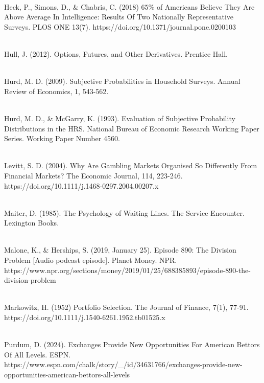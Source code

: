 \documentclass[sn-mathphys-num]{sn-jnl}
\theoremstyle{thmstyleone}%
\theoremstyle{thmstyletwo}%
\theoremstyle{thmstylethree}%
\begin{document}
\begin{thebibliography}{9}
\\Heck, P., Simons, D., \& Chabris, C. (2018) $65\%$ of Americans Believe They Are Above Average In Intelligence: Results Of Two Nationally Representative Surveys. PLOS ONE 13(7). https://doi.org/10.1371/journal.pone.0200103 \vspace{5pt}

\\Hull, J. (2012). Options, Futures, and Other Derivatives. Prentice Hall.  \vspace{5pt}

\\Hurd, M. D. (2009). Subjective Probabilities in Household Surveys. Annual Review of Economics, 1, 543-562. \vspace{5pt}

\\Hurd, M. D., \& McGarry, K. (1993). Evaluation of Subjective Probability Distributions in the HRS. National Bureau of Economic Research Working Paper Series. Working Paper Number 4560. \vspace{5pt}

\\Levitt, S. D. (2004). Why Are Gambling Markets Organised So Differently From Financial Markets? The Economic Journal, 114, 223-246. https://doi.org/10.1111/j.1468-0297.2004.00207.x \vspace{5pt}

\\Maiter, D. (1985). The Psychology of Waiting Lines. The Service Encounter. Lexington Books. \vspace{5pt}

\\Malone, K., \& Herships, S. (2019, January 25). Episode 890: The Division Problem [Audio podcast episode]. Planet Money. NPR.  https://www.npr.org/sections/money/2019/01/25/688385893/episode-890-the-division-problem \vspace{5pt}

\\Markowitz, H. (1952) Portfolio Selection. The Journal of Finance, 7(1), 77-91. https://doi.org/10.1111/j.1540-6261.1952.tb01525.x \vspace{5pt}

\\Purdum, D. (2024). Exchanges Provide New Opportunities For American Bettors Of All Levels. ESPN. https://www.espn.com/chalk/story/_/id/34631766/exchanges-provide-new-opportunities-american-bettors-all-levels \vspace{5pt}


\end{thebibliography}
\end{document}
